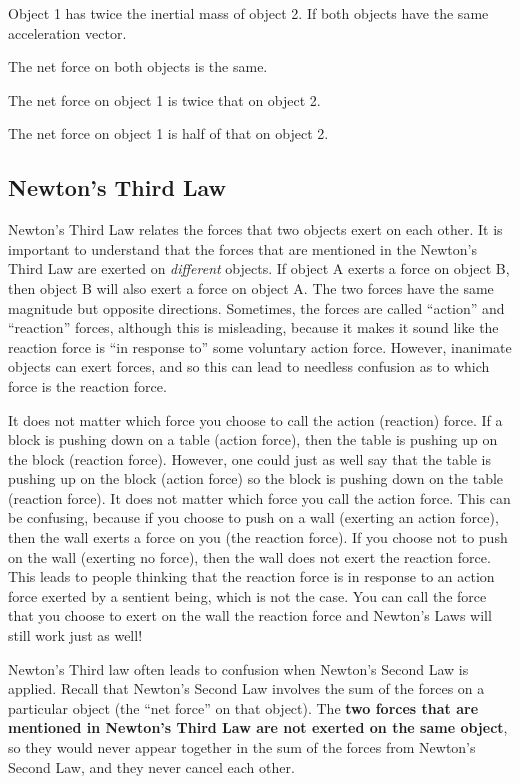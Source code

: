 \begin{checkpoint}
\begin{MCquestion}{Object 1 has twice the inertial mass of object 2. If both objects have the same acceleration vector.}
\item The net force on both objects is the same.
\item The net force on object 1 is twice that on object 2. \correct
\item The net force on object 1 is half of that on object 2.
\end{MCquestion}
\end{checkpoint}


\subsection{Newton's Third Law}
Newton's Third Law relates the forces that two objects exert on each other. It is important to understand that the forces that are mentioned in the Newton's Third Law are exerted on \textit{different} objects. If object A exerts a force on object B, then object B will also exert a force on object A. The two forces have the same magnitude but opposite directions. Sometimes, the forces are called ``action'' and ``reaction'' forces, although this is misleading, because it makes it sound like the reaction force is ``in response to'' some voluntary action force. However, inanimate objects can exert forces, and so this can lead to needless confusion as to which force is the reaction force.

It does not matter which force you choose to call the action (reaction) force. If a block is pushing down on a table (action force), then the table is pushing up on the block (reaction force). However, one could just as well say that the table is pushing up on the block (action force) so the block is pushing down on the table (reaction force). It does not matter which force you call the action force. This can be confusing, because if you choose to push on a wall (exerting an action force), then the wall exerts a force on you (the reaction force). If you choose not to push on the wall (exerting no force), then the wall does not exert the reaction force. This leads to people thinking that the reaction force is in response to an action force exerted by a sentient being, which is not the case. You can call the force that you choose to exert on the wall the reaction force and Newton's Laws will still work just as well!

Newton's Third law often leads to confusion when Newton's Second Law is applied. Recall that Newton's Second Law involves the sum of the forces on a particular object (the ``net force'' on that object). The \textbf{two forces that are mentioned in Newton's Third Law are not exerted on the same object}, so they would never appear together in the sum of the forces from Newton's Second Law, and they never cancel each other. 

